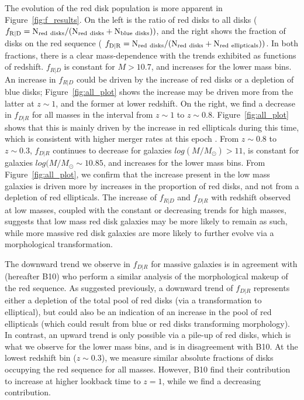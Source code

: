 \documentclass[useAMS,usenatbib]{mn2e}
\begin{document}
The evolution of the red disk population is more apparent in Figure~\ref{fig:f_results}. On the left is the ratio of red disks to all disks ($f_{\rm R|D} = \rm N_{\rm red~disks}/(N_{\rm red~disks}+N_{\rm blue~disks}))$, and the right shows the fraction of disks on the red sequence ( $f_{\rm D|R} = \rm N_{\rm red~disks}/(N_{\rm red~disks}+N_{\rm red~ellipticals}))$. In both fractions, there is a clear mass-dependence with the trends exhibited as functions of redshift. $f_{R|D}$ is constant for $M>10.7$, and increases for the lower mass bins. An increase in $f_{R|D}$ could be driven by the increase of red disks or a depletion of blue disks; Figure~\ref{fig:all_plot} shows the increase may be driven more from the latter at $z\sim1$, and the former at lower redshift. On the right, we find a decrease in $f_{D|R}$ for all masses in the interval from $z\sim1$ to $z\sim0.8$. Figure~\ref{fig:all_plot} shows that this is mainly driven by the increase in red ellipticals during this time, which is consistent with higher merger rates at this epoch \citep{Molina2016}. From $z\sim0.8$ to $z\sim0.3$, $f_{D|R}$ continues to decrease for galaxies $log(M/M_{\odot})>11$, is constant for galaxies $log(M/M_{\odot}\sim10.85$, and increases for the lower mass bins. From Figure~\ref{fig:all_plot}, we confirm that the increase present in the low mass galaxies is driven more by increases in the proportion of red disks, and not from a depletion of red ellipticals. The increase of $f_{R|D}$ and $f_{D|R}$ with redshift observed at low masses, coupled with the constant or decreasing trends for high masses, suggests that low mass red disk galaxies may be more likely to remain as such, while more massive red disk galaxies are more likely to further evolve via a morphological transformation. 

The downward trend we observe in $f_{D|R}$ for massive galaxies is in agreement with \citet{Bundy2010} (hereafter B10) who perform a similar analysis of the morphological makeup of the red sequence. As suggested previously, a downward trend of $f_{D|R}$ represents either a depletion of the total pool of red disks (via a transformation to elliptical), but could also be an indication of an increase in the pool of red ellipticals (which could result from blue or red disks transforming morphology). In contrast, an upward trend is only possible via a pile-up of red disks, which is what we observe for the lower mass bins, and is in disagreement with B10. At the lowest redshift bin ($z\sim0.3$), we measure similar absolute fractions of disks occupying the red sequence for all masses. However, B10 find their contribution to increase at higher lookback time to $z=1$, while we find a decreasing contribution. 
\end{document}
